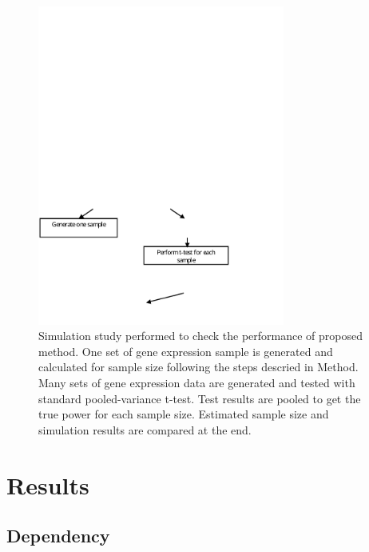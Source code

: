 \documentclass{bioinfo}
\begin{document}
\begin{figure}[h]
  \centerline{\includegraphics*[width=3.2in]{SimuFC.pdf}}
  \caption[Flow Chart for Simulation Study]{ Simulation study
  performed to check the performance of proposed method.  One set of
  gene expression sample is generated and calculated for sample size
  following the steps descried in Method. Many sets of gene
  expression data are generated and tested with standard
  pooled-variance t-test. Test results are pooled to get
  the true power for each sample size. Estimated sample size and
  simulation results are compared at the end.}  
  \label{fig:SimuFC}
\end{figure}

\section{Results}

\subsection{Dependency}
\end{document}
